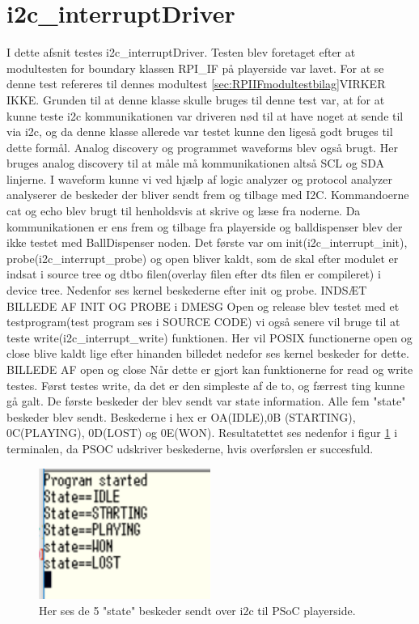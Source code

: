 \documentclass[Modultest/Modultest_main.tex]{subfiles}
\begin{document}
\section{i2c\_interruptDriver}\label{sec:I2C_interruptDriver_modultest_bilag}
I dette afsnit testes i2c\_interruptDriver. Testen blev foretaget efter at modultesten for boundary klassen RPI\_IF på playerside var lavet. For at se denne test refereres til dennes modultest \ref{sec:RPIIFmodultestbilag}VIRKER IKKE. Grunden til at denne klasse skulle bruges til denne test var, at for at kunne teste i2c kommunikationen var driveren nød til at have noget at sende til via i2c, og da denne klasse allerede var testet kunne den ligeså godt bruges til dette formål. Analog discovery og programmet waveforms blev også brugt. Her bruges analog discovery til at måle må kommunikationen altså SCL og SDA linjerne. I waveform kunne vi ved hjælp af logic analyzer og protocol analyzer analyserer de beskeder der bliver sendt frem og tilbage med I2C. Kommandoerne cat og echo blev brugt til henholdsvis at skrive og læse fra noderne. Da kommunikationen er ens frem og tilbage fra playerside og balldispenser blev der ikke testet med BallDispenser noden. Det første var om init(i2c\_interrupt\_init), probe(i2c\_interrupt\_probe) og open bliver kaldt, som de skal efter modulet er indsat i source tree og dtbo filen(overlay filen efter dts filen er compileret) i device tree. Nedenfor ses kernel beskederne efter init og probe.
INDSÆT BILLEDE AF INIT OG PROBE i DMESG
Open og release blev testet med et testprogram(test program ses i SOURCE CODE) vi også senere vil bruge til at teste write(i2c\_interrupt\_write) funktionen. Her vil POSIX functionerne open og close blive kaldt lige efter hinanden billedet nedefor ses kernel beskeder for dette. 
BILLEDE AF open og close
Når dette er gjort kan funktionerne for read og write testes. Først testes write, da det er den simpleste af de to, og færrest ting kunne gå galt. De første beskeder der blev sendt var state information. Alle fem "state" beskeder blev sendt. Beskederne i hex er OA(IDLE),0B (STARTING), 0C(PLAYING), 0D(LOST) og 0E(WON).  Resultatettet ses nedenfor i figur \ref{fig:states_write} i terminalen, da PSOC udskriver beskederne, hvis overførslen er succesfuld.
\begin{figure}[H]
    \centering
    \includegraphics[width=0.5\textwidth]{Modultest/i2c_interruptDriver/graphics/states.PNG}
    \caption{Her ses de 5 "state" beskeder sendt over i2c til PSoC playerside.}
    \label{fig:states_write}
\end{figure}
\end{document}
